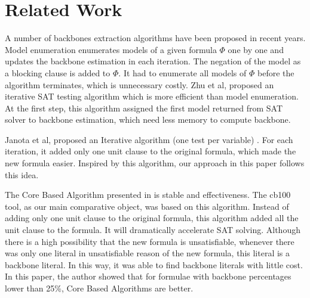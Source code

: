 \section{Related Work}\label{sec:relw}

A number of backbones extraction algorithms have been proposed in recent years. 
Model enumeration \cite{MK2002,RSF2004} enumerates models of a given formula $\Phi$ one by one and updates the backbone estimation in each iteration. The negation of the model as a blocking clause is added to $\Phi$. It had to enumerate all models of $\Phi$ before the algorithm terminates, which is unnecessary costly.
Zhu et al, proposed an iterative SAT testing algorithm \cite{Z11} which is more efficient than model enumeration. At the first step, this algorithm assigned the first model returned from SAT solver to backbone estimation, which need less memory to compute backbone.

Janota et al, proposed an Iterative algorithm (one test per variable) \cite{JLM15}. For each iteration, it added only one unit clause to the original formula, which made the new formula easier. Inspired by this algorithm, our approach in this paper follows this idea.

The Core Based Algorithm presented in \cite{JLM15} is stable and effectiveness. The cb100 tool, as our main comparative object, was based on this algorithm. Instead of adding only one unit clause to the original formula, this algorithm added all the unit clause to the formula. It will dramatically accelerate SAT solving. Although there is a high possibility that the new formula is unsatisfiable, whenever there was only one literal in unsatisfiable reason of the new formula, this literal is a backbone literal. In this way, it was able to find backbone literals with little cost. In this paper, the author showed that for formulae with backbone percentages lower than 25\%, Core Based Algorithms are better.


